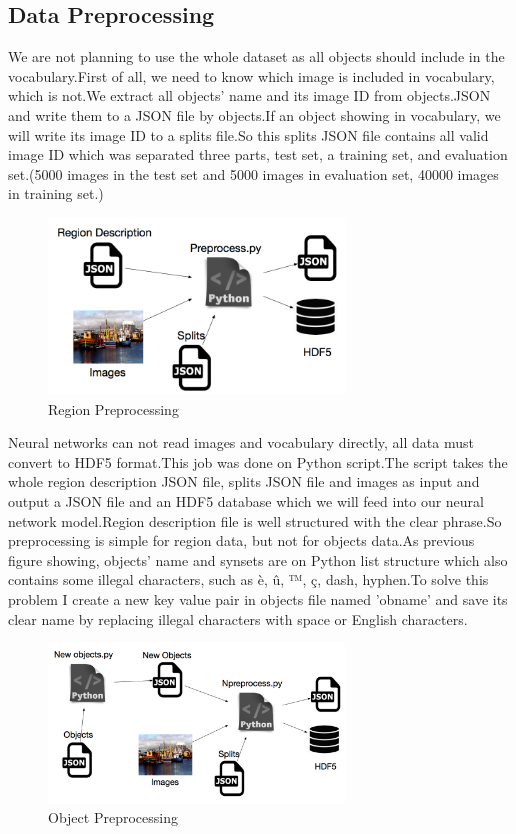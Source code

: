 \documentclass[12pt,a4paper]{report}
\begin{document}
\subsection{Data Preprocessing}
We are not planning to use the whole dataset as all objects should include in the vocabulary.First of all, we need to know which image is included in vocabulary, which is not.We extract all objects' name and its image ID  from objects.JSON  and write them to a JSON file by objects.If an object showing in vocabulary, we will write its image ID to a splits file.So this splits JSON file contains all valid image ID which was separated three parts, test set, a training set, and evaluation set.(5000 images in the test set and 5000 images in evaluation set, 40000 images in training set.)
\begin{figure}[h]
\centering
\includegraphics[width=0.7\textwidth]{regionc.png}
\caption{Region Preprocessing}
\end{figure}

Neural networks can not read images and vocabulary directly, all data must convert to HDF5 format.This job was done on Python script.The script takes the whole region description JSON file, splits JSON file and images as input and output a JSON file and an HDF5 database which we will feed into our neural network model.Region description file is well structured with the clear phrase.So preprocessing is simple for region data, but not for objects data.As previous figure showing, objects' name and synsets are on Python list structure which also contains some illegal characters, such as è, û, ™, ç, dash, hyphen.To solve this problem I create a new key value pair in objects file named 'obname' and save its clear name by replacing illegal characters with space or English characters.

\begin{figure}[h]
\centering
\includegraphics[width=0.7\textwidth]{objectc.png}
\caption{Object Preprocessing}
\end{figure}
\end{document}
